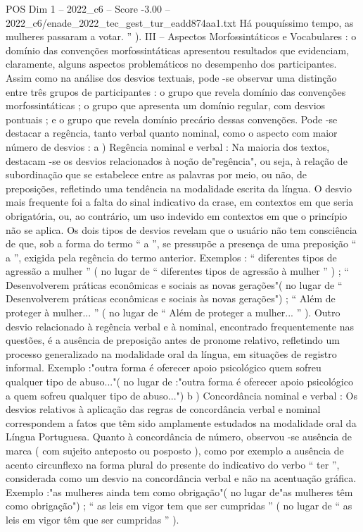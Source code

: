 \begin{textsample}{POS Dim 1 – 2022\_c6 – Score -3.00 – 2022\_c6/enade\_2022\_tec\_gest\_tur\_eadd874aa1.txt}
Há pouquíssimo tempo, as mulheres passaram a votar. ” ).
III – Aspectos Morfossintáticos e Vocabulares : o domínio das convenções morfossintáticas apresentou resultados que evidenciam, claramente, alguns aspectos problemáticos no desempenho dos participantes.
Assim como na análise dos desvios textuais, pode -se observar uma distinção entre três grupos de participantes : o grupo que revela domínio das convenções morfossintáticas ; o grupo que apresenta um domínio regular, com desvios pontuais ; e o grupo que revela domínio precário dessas convenções.
Pode -se destacar a regência, tanto verbal quanto nominal, como o aspecto com maior número de desvios : a ) Regência nominal e verbal : Na maioria dos textos, destacam -se os desvios relacionados à noção de"regência", ou seja, à relação de subordinação que se estabelece entre as palavras por meio, ou não, de preposições, refletindo uma tendência na modalidade escrita da língua.
O desvio mais frequente foi a falta do sinal indicativo da crase, em contextos em que seria obrigatória, ou, ao contrário, um uso indevido em contextos em que o princípio não se aplica.
Os dois tipos de desvios revelam que o usuário não tem consciência de que, sob a forma do termo “ a ”, se pressupõe a presença de uma preposição “ a ”, exigida pela regência do termo anterior.
Exemplos : “ diferentes tipos de agressão a mulher ” ( no lugar de “ diferentes tipos de agressão à mulher ” ) ; “ Desenvolverem práticas econômicas e sociais as novas gerações"( no lugar de “ Desenvolverem práticas econômicas e sociais às novas gerações") ; “ Além de proteger à mulher... ” ( no lugar de “ Além de proteger a mulher... ” ).
Outro desvio relacionado à regência verbal e à nominal, encontrado frequentemente nas questões, é a ausência de preposição antes de pronome relativo, refletindo um processo generalizado na modalidade oral da língua, em situações de registro informal.
Exemplo :"outra forma é oferecer apoio psicológico quem sofreu qualquer tipo de abuso..."( no lugar de :"outra forma é oferecer apoio psicológico a quem sofreu qualquer tipo de abuso...") b ) Concordância nominal e verbal : Os desvios relativos à aplicação das regras de concordância verbal e nominal correspondem a fatos que têm sido amplamente estudados na modalidade oral da Língua Portuguesa.
Quanto à concordância de número, observou -se ausência de marca ( com sujeito anteposto ou posposto ), como por exemplo a ausência de acento circunflexo na forma plural do presente do indicativo do verbo “ ter ”, considerada como um desvio na concordância verbal e não na acentuação gráfica.
Exemplo :"as mulheres ainda tem como obrigação"( no lugar de"as mulheres têm como obrigação") ; “ as leis em vigor tem que ser cumpridas ” ( no lugar de “ as leis em vigor têm que ser cumpridas ” ).

\end{textsample}
